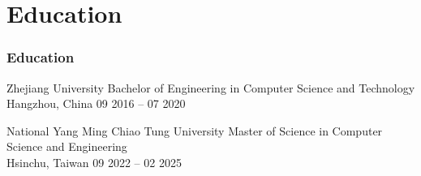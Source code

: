 \documentclass{beamer}
\begin{document}

\section{Education}
\begin{frame}
    \frametitle{Education}
    \begin{block}{Zhejiang University} %
        Bachelor of Engineering in Computer Science and Technology\\
        Hangzhou, China \hfill 09 2016 – 07 2020
    \end{block}
    \begin{block}{National Yang Ming Chiao Tung University}
        Master of Science in Computer Science and Engineering\\
        Hsinchu, Taiwan \hfill 09 2022 – 02 2025
    \end{block}
\end{frame}

\end{document}
